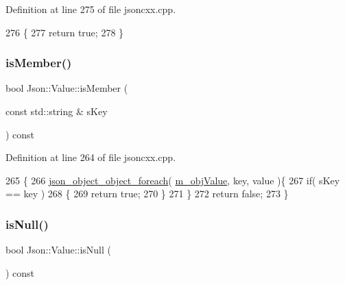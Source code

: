 Definition at line 275 of file jsoncxx.\+cpp.


\begin{DoxyCode}
276     \{
277         \textcolor{keywordflow}{return} \textcolor{keyword}{true};
278     \}
\end{DoxyCode}
\mbox{\label{class_json_1_1_value_a0daec7ab118bed59dea6b16d1511bc47}} 
\subsubsection{\texorpdfstring{is\+Member()}{isMember()}}
{\footnotesize\ttfamily bool Json\+::\+Value\+::is\+Member (\begin{DoxyParamCaption}\item[{const std\+::string \&}]{s\+Key }\end{DoxyParamCaption}) const}



Definition at line 264 of file jsoncxx.\+cpp.


\begin{DoxyCode}
265     \{
266         \hyperlink{json__object_8h_acf5f514a9e0061c10fc08055762639ee}{json\_object\_object\_foreach}( \hyperlink{class_json_1_1_value_a3a705e06c2dbc4a6e142b58b0cbca57e}{m\_objValue}, key, value )\{
267             \textcolor{keywordflow}{if}( sKey == key )
268             \{
269                 \textcolor{keywordflow}{return} \textcolor{keyword}{true};
270             \}
271         \}
272         \textcolor{keywordflow}{return} \textcolor{keyword}{false};
273     \}
\end{DoxyCode}
\mbox{\label{class_json_1_1_value_abde4070e21e46dc4f8203f66582cb19f}} 
\subsubsection{\texorpdfstring{is\+Null()}{isNull()}}
{\footnotesize\ttfamily bool Json\+::\+Value\+::is\+Null (\begin{DoxyParamCaption}{ }\end{DoxyParamCaption}) const}

\mbox{\label{class_json_1_1_value_a8cf96c0f2a552051fcfc78ffee60e037}} 
